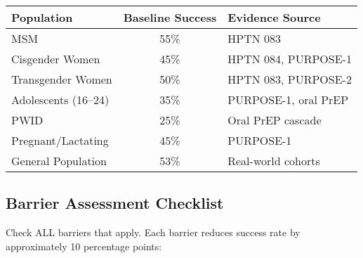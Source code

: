 \documentclass[11pt]{article}
\begin{document}
\begin{table}[h]
\centering
\begin{tabular}{|l|c|l|}
\hline
\textbf{Population} & \textbf{Baseline Success} & \textbf{Evidence Source} \\
\hline
MSM & 55\% & HPTN 083 \\
Cisgender Women & 45\% & HPTN 084, PURPOSE-1 \\
Transgender Women & 50\% & HPTN 083, PURPOSE-2 \\
Adolescents (16--24) & 35\% & PURPOSE-1, oral PrEP \\
PWID & 25\% & Oral PrEP cascade \\
Pregnant/Lactating & 45\% & PURPOSE-1 \\
General Population & 53\% & Real-world cohorts \\
\hline
\end{tabular}
\end{table}

\subsection{Barrier Assessment Checklist}

Check ALL barriers that apply. Each barrier reduces success rate by approximately 10 percentage points:
\end{document}

